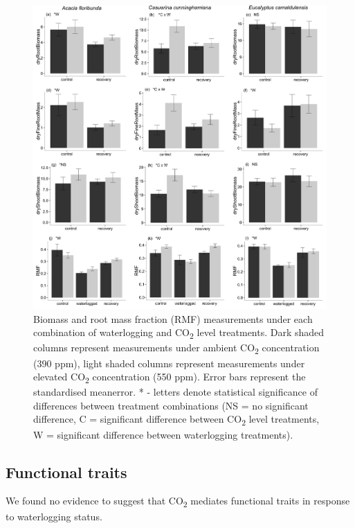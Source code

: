 \documentclass[12pt,a4paper]{memoir}
\begin{document}
\begin{figure}[h!]
\begin{center}
\includegraphics[width=\linewidth, keepaspectratio=true]{biomass2.png} %
\caption[Biomass and root mass fraction (RMF) measurements under each combination of waterlogging and CO\textsubscript{2} level treatments.]{\small{Biomass and root mass fraction (RMF) measurements under each combination of waterlogging and CO\textsubscript{2} level treatments. Dark shaded columns represent measurements under ambient CO\textsubscript{2} concentration (390 ppm), light shaded columns represent measurements under elevated CO\textsubscript{2} concentration (550 ppm). Error bars represent the standardised meanerror. * - letters denote statistical significance of differences between treatment combinations (NS = no significant difference, C = significant difference between CO\textsubscript{2} level treatments, W = significant difference between waterlogging treatments).}} %
\label{Ch5_F2} %
\end{center}
\end{figure}
\subsection*{Functional traits}
We found no evidence to suggest that CO\textsubscript{2} mediates functional traits in response to waterlogging status.
\end{document}

